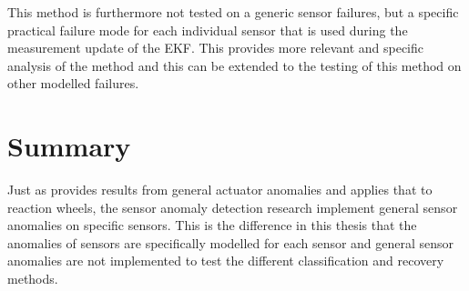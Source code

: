 This method is furthermore not tested on a generic sensor failures, but a specific practical failure mode for each individual sensor that is used during the measurement update of the EKF. This provides more relevant and specific analysis of the method and this can be extended to the testing of this method on other modelled failures. 

\section{Summary}
Just as \cite{jin2008fault} provides results from general actuator anomalies and applies that to reaction wheels, the sensor anomaly detection research implement general sensor anomalies on specific sensors. This is the difference in this thesis that the anomalies of sensors are specifically modelled for each sensor and general sensor anomalies are not implemented to test the different classification and recovery methods.

